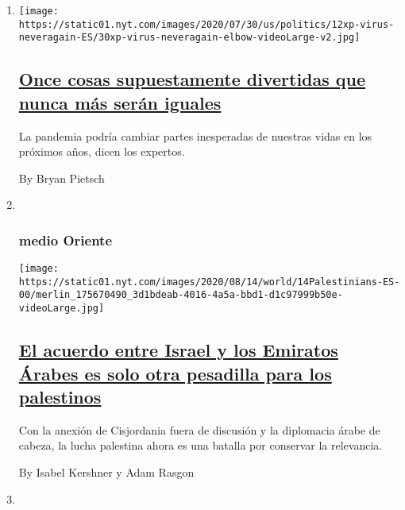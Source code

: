 \begin{enumerate}
\def\labelenumi{\arabic{enumi}.}
\item
  \texttt{[image: https://static01.nyt.com/images/2020/07/30/us/politics/12xp-virus-neveragain-ES/30xp-virus-neveragain-elbow-videoLarge-v2.jpg]}

  \hypertarget{once-cosas-supuestamente-divertidas-que-nunca-muxe1s-seruxe1n-iguales}{%
  \subsection{\texorpdfstring{\href{/es/2020/08/15/espanol/ciencia-y-tecnologia/coronavirus-actividades-prohibidas.html}{Once
  cosas supuestamente divertidas que nunca más serán
  iguales}}{Once cosas supuestamente divertidas que nunca más serán iguales}}\label{once-cosas-supuestamente-divertidas-que-nunca-muxe1s-seruxe1n-iguales}}

  La pandemia podría cambiar partes inesperadas de nuestras vidas en los
  próximos años, dicen los expertos.

  By Bryan Pietsch
\item ~
  \hypertarget{medio-oriente}{%
  \subsubsection{medio Oriente}\label{medio-oriente}}

  \texttt{[image: https://static01.nyt.com/images/2020/08/14/world/14Palestinians-ES-00/merlin\_175670490\_3d1bdeab-4016-4a5a-bbd1-d1c97999b50e-videoLarge.jpg]}

  \hypertarget{el-acuerdo-entre-israel-y-los-emiratos-uxe1rabes-es-solo-otra-pesadilla-para-los-palestinos}{%
  \subsection{\texorpdfstring{\href{/es/2020/08/14/espanol/mundo/palestinos-israel-acuerdo-paz-uae.html}{El
  acuerdo entre Israel y los Emiratos Árabes es solo otra pesadilla para
  los
  palestinos}}{El acuerdo entre Israel y los Emiratos Árabes es solo otra pesadilla para los palestinos}}\label{el-acuerdo-entre-israel-y-los-emiratos-uxe1rabes-es-solo-otra-pesadilla-para-los-palestinos}}

  Con la anexión de Cisjordania fuera de discusión y la diplomacia árabe
  de cabeza, la lucha palestina ahora es una batalla por conservar la
  relevancia.

  By Isabel Kershner y Adam Rasgon
\item ~
  \hypertarget{sabores}{%
}
\end{enumerate}
